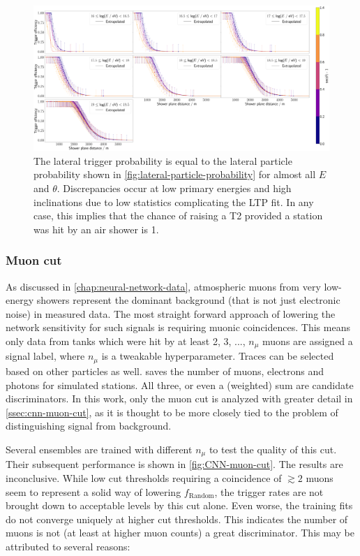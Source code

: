 \begin{figure}
	\centering
	\includegraphics[width=1\textwidth]{./plots/ideal_classifier_LTP.png}
	\caption{The lateral trigger probability is equal to the lateral particle probability shown in \autoref{fig:lateral-particle-probability} for almost all 
	$E$ and $\theta$. Discrepancies occur at low primary energies and high inclinations due to low statistics complicating the LTP fit. In any case, this implies 
	that the chance of raising a T2 provided a station was hit by an air shower is 1.}
	\label{fig:NN-LPP}
\end{figure}

\subsubsection{Muon cut}

As discussed in \autoref{chap:neural-network-data}, atmospheric muons from very low-energy showers represent the dominant background (that is not just electronic 
noise) in measured data. The most straight forward approach of lowering the network sensitivity for such signals is requiring muonic coincidences. This means only 
data from tanks which were hit by at least 2, 3, ..., $n_\mu$ muons are assigned a signal label, where $n_\mu$ is a tweakable hyperparameter. Traces can be 
selected based on other particles as well. \Offline saves the number of muons, electrons and photons for simulated stations. All three, or even a (weighted) sum
are candidate discriminators. In this work, only the muon cut is analyzed with greater detail in \autoref{ssec:cnn-muon-cut}, as it is thought to be more closely 
tied to the problem of distinguishing signal from background.

Several ensembles are trained with different $n_\mu$ to test the quality of this cut. Their subsequent performance is shown in \autoref{fig:CNN-muon-cut}. The 
results are inconclusive. While low cut thresholds requiring a coincidence of $\gtrsim 2$ muons seem to represent a solid way of lowering $f_\text{Random}$, the 
trigger rates are not brought down to acceptable levels by this cut alone. Even worse, the training fits do not converge uniquely at higher cut thresholds.
This indicates the number of muons is not (at least at higher muon counts) a great discriminator. This may be attributed to several reasons:


